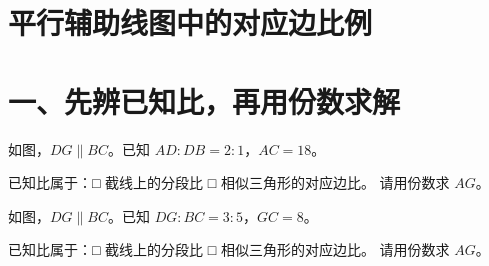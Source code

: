 \documentclass{exam-zh}
\begin{document}
\section*{平行辅助线图中的对应边比例}

\section*{一、先辨已知比，再用份数求解}


\begin{problem}[points=10]
  \noindent
  \begin{minipage}[t]{\dimexpr\linewidth-60mm-6mm\relax}
    \vspace{0pt}
    如图，$DG\parallel BC$。已知 $AD:DB=2:1$，$AC=18$。

已知比属于：\quad □ 截线上的分段比 \quad □ 相似三角形的对应边比。
请用份数求 $AG$。


  \end{minipage}\hfill
  \begin{diagramcoltikz}{60mm}{第 1 题图}
  }
  \end{diagramcoltikz}
  \par\medskip
  \answerarea[33mm]
\end{problem}



\begin{problem}[points=10]
  \noindent
  \begin{minipage}[t]{\dimexpr\linewidth-60mm-6mm\relax}
    \vspace{0pt}
    如图，$DG\parallel BC$。已知 $DG:BC=3:5$，$GC=8$。

已知比属于：\quad □ 截线上的分段比 \quad □ 相似三角形的对应边比。
请用份数求 $AG$。


  \end{minipage}\hfill
  \begin{diagramcoltikz}{60mm}{第 2 题图}
  }
  \end{diagramcoltikz}
  \par\medskip
  \answerarea[33mm]
\end{problem}


\end{document}
